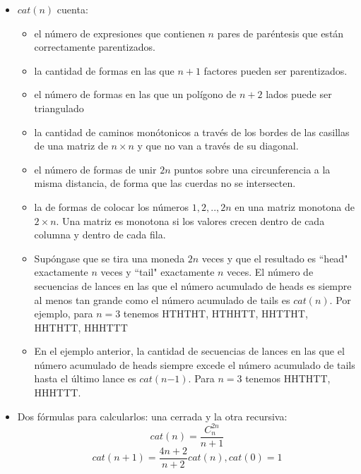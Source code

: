 \begin{itemize}
	\item{
		$cat(n)$  cuenta:
		
		\begin{itemize}
			\item{el n\'umero de expresiones que contienen $n$ pares de par\'entesis que 
				est\'an correctamente parentizados.}
			\item{la cantidad de formas en las que $n+1$ factores pueden ser parentizados.}
		    \item{el n\'umero de formas en las que un pol\'igono de $n+2$ lados puede ser triangulado}
		    \item{ la cantidad de caminos mon\'otonicos a trav\'es de los bordes de las casillas de una matriz de $n \times n$
				y que no van a trav\'es de su diagonal.}
			\item{el n\'umero de formas de unir $2 n$ puntos sobre una circunferencia a la misma distancia, de
				forma que las cuerdas no se intersecten.}
			\item{la  de formas de colocar los n\'umeros $1, 2, .., {2n}$ en una matriz monotona de $2 \times n$. Una
				matriz es monotona si los valores crecen dentro de cada columna y dentro de cada fila.}
			\item{Sup\'ongase que se tira una moneda $2 n$ veces y que el resultado es ``head" exactamente $n$ veces 
				y ``tail" exactamente $n$ veces. El n\'umero de secuencias de lances en las que el n\'umero acumulado 
				de heads es siempre al menos tan grande como el n\'umero acumulado de tails es $cat(n)$. Por ejemplo,
				para $n=3$ tenemos HTHTHT, HTHHTT, HHTTHT, HHTHTT, HHHTTT}
			\item{En el ejemplo anterior, la cantidad de secuencias de lances en las que el n\'umero acumulado de 
				heads siempre excede el n\'umero acumulado de tails hasta el \'ultimo lance es $cat( {n} {-1}) $. Para $n=3$ 
				tenemos HHTHTT, HHHTTT. }	
		\end{itemize}
	}
	\item{
		Dos f\'ormulas para calcularlos: una cerrada y la otra recursiva:
		$$cat(n) = \frac{C^{2n}_n}{n+1}$$
		$$cat(n+1) = \frac{4n+2}{n+2} cat(n), cat(0) = 1$$
	}
\end{itemize}
